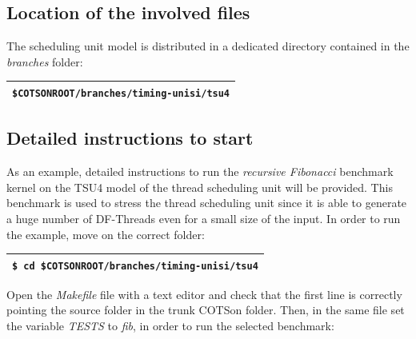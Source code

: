 \documentclass[a4paper]{article}
\begin{document}
\subsection[Location of the involved files]{Location of the involved
files}
{
The scheduling unit model is distributed in a dedicated directory
contained in the \textit{branches} folder:}

\begin{flushleft}
\tablehead{}
\begin{supertabular}{|m{6.34626in}|}
\hline
{}
\texttt{\$COTSONROOT/branches/timing-unisi/tsu4}\\\hline
\end{supertabular}
\end{flushleft}
\subsection[Detailed instructions to start]{Detailed instructions to
start}
{
As an example, detailed instructions to run the \textit{recursive
Fibonacci} benchmark kernel on the TSU4 model of the thread scheduling
unit will be provided. This benchmark is used to stress the thread
scheduling unit since it is able to generate a huge number of
DF-Threads even for a small size of the input. In order to run the
example, move on the correct folder:}

\begin{flushleft}
\tablehead{}
\begin{supertabular}{|m{6.34626in}|}
\hline
{} \texttt{\$ cd
\$COTSONROOT/branches/timing-unisi/tsu4}\\\hline
\end{supertabular}
\end{flushleft}
{
Open the \textit{Makefile} file with a text editor and check that the
first line is correctly pointing the source folder in the trunk COTSon
folder. Then, in the same file set the variable \textit{TESTS} to
\textit{fib}, in order to run the selected benchmark:}
\end{document}
